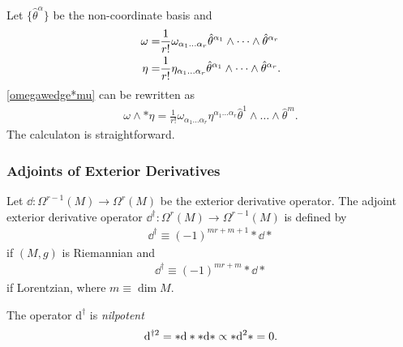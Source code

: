 \documentclass[10pt]{article}
\begin{document}
\begin{remark}
    Let $\{\hat{\theta}^\alpha\}$ be the non-coordinate basis and
    \begin{align}
        \omega= & \frac{1}{r!}\omega_{\alpha_1\dots\alpha_r}\hat{\theta}^{\alpha_1}\wedge\dots\wedge\hat{\theta}^{\alpha_r}\notag \\
        \eta=   & \frac{1}{r!}\eta_{\alpha_1\dots\alpha_r}\hat{\theta}^{\alpha_1}\wedge\dots\wedge\hat{\theta}^{\alpha_r}.\notag
    \end{align}
    \eqref{omegawedge*mu} can be rewritten as
    \begin{align}
        \omega\wedge\ast\eta=\frac{1}{r!}\omega_{\alpha_1\dots\alpha_r}\eta^{\alpha_1\dots\alpha_r}\hat{\theta}^1\wedge\dots\wedge\hat{\theta}^m.
    \end{align}
    The calculaton is straightforward.
\end{remark}

\subsubsection{Adjoints of Exterior Derivatives}
\begin{definition}
    Let $\dd:\Omega^{r-1}(M)\to\Omega^r(M)$ be the exterior derivative operator.
    The adjoint exterior derivative operator $\dd^{\dagger}:\Omega^r(M)\to\Omega^{r-1}(M)$ is defined by
    \begin{align}
        \dd^\dagger \equiv(-1)^{mr+m+1}\ast\dd\ast
    \end{align}
    if $(M,g)$ is Riemannian and
    \begin{align}
        \dd^\dagger\equiv(-1)^{mr+m}\ast\dd\ast
    \end{align}
    if Lorentzian, where $m\equiv\dim M$.
\end{definition}
\begin{property}
    The operator $\mathrm{d}^{\dagger}$ is \textit{nilpotent}
    \begin{align}
        \mathrm{d}^{\dagger 2}=\ast\mathrm{d}\ast\ast\mathrm{d}\ast\propto\ast\mathrm{d}^2\ast=0.
    \end{align}
\end{property}
\end{document}
